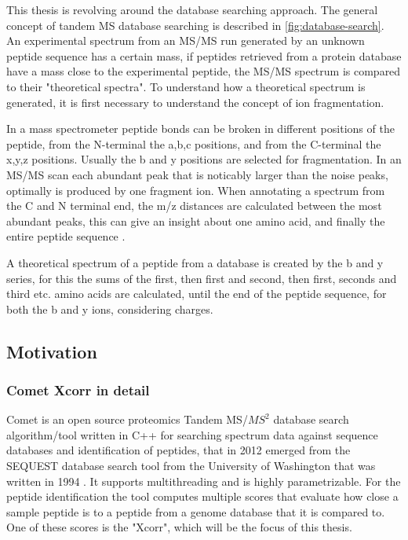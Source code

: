 \documentclass[11pt]{article}
\begin{document}
This thesis is revolving around the database searching approach. The general concept of tandem MS database searching is described in \cref{fig:database-search}. An experimental spectrum from an MS/MS run generated by an unknown peptide sequence has a certain mass,  if peptides retrieved from a protein database have a mass close to the experimental peptide, the MS/MS spectrum is compared to their "theoretical spectra". To understand how a theoretical spectrum is generated, it is first necessary to understand the concept of ion fragmentation. 

In a mass spectrometer peptide bonds can be broken in different positions of the peptide, from the N-terminal the a,b,c positions, and from the C-terminal the x,y,z positions. Usually the b and y positions are selected for fragmentation. In an MS/MS scan each abundant peak that is noticably larger than the noise peaks, optimally is produced by one fragment ion. When annotating a spectrum from the C and N terminal end, the m/z distances are calculated between the most abundant peaks, this can give an insight about one amino acid, and finally the entire peptide sequence \cite{b-y-ions}.

A theoretical spectrum of a peptide from a database is created by the b and y series, for this the sums of the first, then first and second, then first, seconds and third etc. amino acids are calculated, until the end of the peptide sequence, for both the b and y ions, considering charges.

\subsection{Motivation}
\subsubsection{Comet Xcorr in detail}
Comet is an open source proteomics Tandem MS/\(MS^2\) database search algorithm/tool written in C++ for searching spectrum data against sequence databases and identification of peptides, that in 2012 emerged from the SEQUEST database search tool from the University of Washington that was written in 1994 \cite{comet-search-tool}. It supports multithreading and is highly parametrizable. For the peptide identification the tool computes multiple scores that evaluate how close a sample peptide is to a peptide from a genome database that it is compared to. One of these scores is the "Xcorr", which will be the focus of this thesis. 
\end{document}

